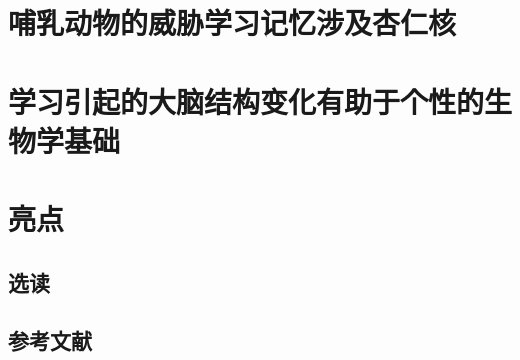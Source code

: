 \section{哺乳动物的威胁学习记忆涉及杏仁核}

\section{学习引起的大脑结构变化有助于个性的生物学基础}

\section{亮点}
\subsection{选读}
\subsection{参考文献}